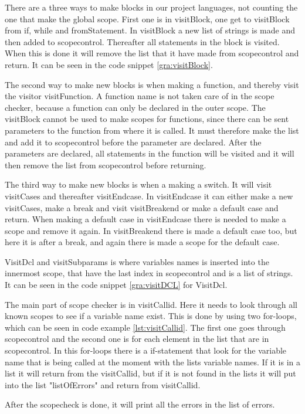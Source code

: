 There are a three ways to make blocks in our project languages, not counting the one that make the global scope. First one is in visitBlock, one get to visitBlock from if, while and fromStatement. In visitBlock a new list of strings is made and then added to scopecontrol. Thereafter all statements in the block is visited. When this is done it will remove the list that it have made from scopecontrol and return. It can be seen in the code snippet \ref{gra:visitBlock}.


The second way to make new blocks is when making a function, and thereby visit the visitor visitFunction. A function name is not taken care of in the scope checker, because a function can only be declared in the outer scope. The visitBlock cannot be used to make scopes for functions, since there can be sent parameters to the function from where it is called. It must therefore make the list and add it to scopecontrol before the parameter are declared. After the parameters are declared, all statements in the function will be visited and it will then remove the list from scopecontrol before returning.

The third way to make new blocks is when a making a switch. It will visit visitCases and thereafter visitEndcase. In visitEndcase it can either make a new visitCases, make a break and visit visitBreakend or make a default case and return. When making a default case in visitEndcase there is needed to make a scope and remove it again. In visitBreakend there is made a default case too, but here it is after a break, and again there is made a scope for the default case.


VisitDcl and visitSubparams is where variables names is inserted into the innermost scope, that have the last index in scopecontrol and is a list of strings. It can be seen in the code snippet \ref{gra:visitDCL} for VisitDcl.


The main part of scope checker is in visitCallid. Here it needs to look through all known scopes to see if a variable name exist. This is done by using two for-loops, which can be seen in code example \ref{lst:visitCallid}. The first one goes through scopecontrol and the second one is for each element in the list that are in scopecontrol. In this for-loops there is a if-statement that look for the variable name that is being called at the moment with the lists variable names. If it is in a list it will return from the visitCallid, but if it is not found in the lists it will put into the list "listOfErrors" and return from visitCallid.


After the scopecheck is done, it will print all the errors in the list of errors.
